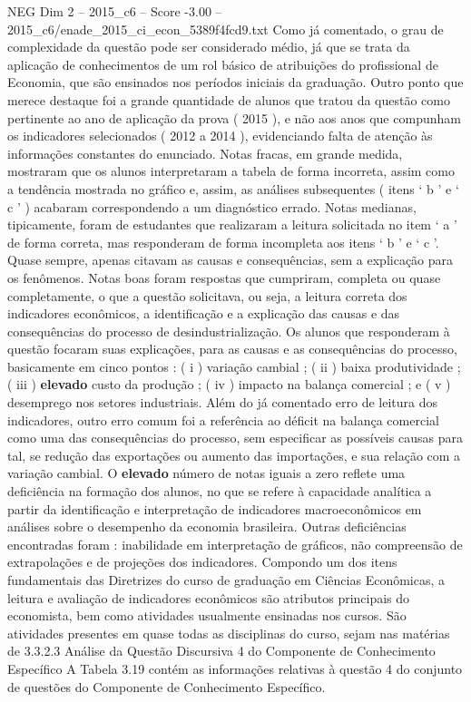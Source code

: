 \begin{textsample}{NEG Dim 2 – 2015\_c6 – Score -3.00 – 2015\_c6/enade\_2015\_ci\_econ\_5389f4fcd9.txt}
Como já comentado, o grau de complexidade da questão pode ser considerado médio, já que se trata da aplicação de conhecimentos de um rol básico de atribuições do profissional de Economia, que são ensinados nos períodos iniciais da graduação.
Outro ponto que merece destaque foi a grande quantidade de alunos que tratou da questão como pertinente ao ano de aplicação da prova ( 2015 ), e não aos anos que compunham os indicadores selecionados ( 2012 a 2014 ), evidenciando falta de atenção às informações constantes do enunciado.
Notas fracas, em grande medida, mostraram que os alunos interpretaram a tabela de forma incorreta, assim como a tendência mostrada no gráfico e, assim, as análises subsequentes ( itens ‘ b ’ e ‘ c ’ ) acabaram correspondendo a um diagnóstico errado.
Notas medianas, tipicamente, foram de estudantes que realizaram a leitura solicitada no item ‘ a ’ de forma correta, mas responderam de forma incompleta aos itens ‘ b ’ e ‘ c ’.
Quase sempre, apenas citavam as causas e consequências, sem a explicação para os fenômenos.
Notas boas foram respostas que cumpriram, completa ou quase completamente, o que a questão solicitava, ou seja, a leitura correta dos indicadores econômicos, a identificação e a explicação das causas e das consequências do processo de desindustrialização.
Os alunos que responderam à questão focaram suas explicações, para as causas e as consequências do processo, basicamente em cinco pontos : ( i ) variação cambial ; ( ii ) baixa produtividade ; ( iii ) \textbf{elevado} custo da produção ; ( iv ) impacto na balança comercial ; e ( v ) desemprego nos setores industriais.
Além do já comentado erro de leitura dos indicadores, outro erro comum foi a referência ao déficit na balança comercial como uma das consequências do processo, sem especificar as possíveis causas para tal, se redução das exportações ou aumento das importações, e sua relação com a variação cambial.
O \textbf{elevado} número de notas iguais a zero reflete uma deficiência na formação dos alunos, no que se refere à capacidade analítica a partir da identificação e interpretação de indicadores macroeconômicos em análises sobre o desempenho da economia brasileira.
Outras deficiências encontradas foram : inabilidade em interpretação de gráficos, não compreensão de extrapolações e de projeções dos indicadores.
Compondo um dos itens fundamentais das Diretrizes do curso de graduação em Ciências Econômicas, a leitura e avaliação de indicadores econômicos são atributos principais do economista, bem como atividades usualmente ensinadas nos cursos.
São atividades presentes em quase todas as disciplinas do curso, sejam nas matérias de 3.3.2.3 Análise da Questão Discursiva 4 do Componente de Conhecimento Específico A Tabela 3.19 contém as informações relativas à questão 4 do conjunto de questões do Componente de Conhecimento Específico.

\end{textsample}
